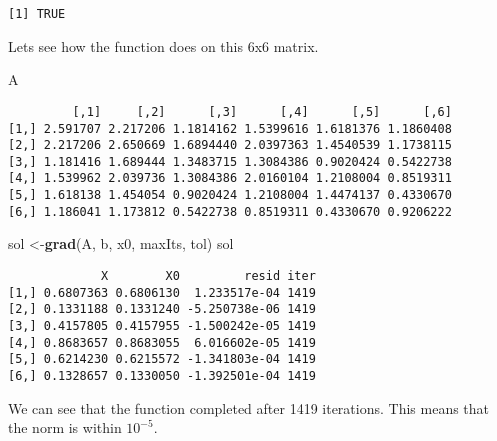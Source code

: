 \documentclass[]{article}
\newenvironment{Shaded}{\begin{snugshade}}{\end{snugshade}}
\newcommand{\KeywordTok}[1]{\textcolor[rgb]{0.13,0.29,0.53}{\textbf{#1}}}
\newcommand{\NormalTok}[1]{#1}
\begin{document}
\begin{verbatim}
[1] TRUE
\end{verbatim}

Lets see how the function does on this 6x6 matrix.

\begin{Shaded}
\begin{Highlighting}[]
\NormalTok{A}
\end{Highlighting}
\end{Shaded}

\begin{verbatim}
         [,1]     [,2]      [,3]      [,4]      [,5]      [,6]
[1,] 2.591707 2.217206 1.1814162 1.5399616 1.6181376 1.1860408
[2,] 2.217206 2.650669 1.6894440 2.0397363 1.4540539 1.1738115
[3,] 1.181416 1.689444 1.3483715 1.3084386 0.9020424 0.5422738
[4,] 1.539962 2.039736 1.3084386 2.0160104 1.2108004 0.8519311
[5,] 1.618138 1.454054 0.9020424 1.2108004 1.4474137 0.4330670
[6,] 1.186041 1.173812 0.5422738 0.8519311 0.4330670 0.9206222
\end{verbatim}

\begin{Shaded}
\begin{Highlighting}[]
\NormalTok{sol <-}\KeywordTok{grad}\NormalTok{(A, b, x0, maxIts, tol)}
\NormalTok{sol}
\end{Highlighting}
\end{Shaded}

\begin{verbatim}
             X        X0         resid iter
[1,] 0.6807363 0.6806130  1.233517e-04 1419
[2,] 0.1331188 0.1331240 -5.250738e-06 1419
[3,] 0.4157805 0.4157955 -1.500242e-05 1419
[4,] 0.8683657 0.8683055  6.016602e-05 1419
[5,] 0.6214230 0.6215572 -1.341803e-04 1419
[6,] 0.1328657 0.1330050 -1.392501e-04 1419
\end{verbatim}

We can see that the function completed after 1419 iterations. This means
that the norm is within \(10^{-5}\).
\end{document}
